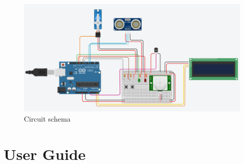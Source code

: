 \documentclass[a4paper,12pt]{report}
\begin{document}
    \begin{figure}[H]
        \centering{}
            \includegraphics[width=\textwidth]{img/Assignment-02_SWDS-Schema.png}
        \caption{Circuit schema}
        \label{img:schema}
    \end{figure}

\appendix
\chapter{User Guide}
\end{document}
